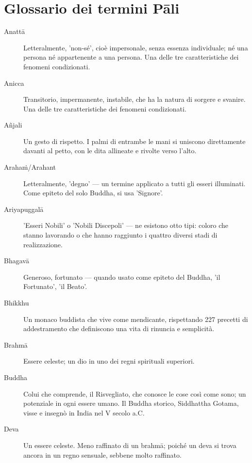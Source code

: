 \chapter{Glossario dei termini Pāli}

\enlargethispage{2\baselineskip}

\begin{description}

\item[Anattā] Letteralmente, 'non-sé', cioè impersonale, senza essenza
  individuale; né una persona né appartenente a una persona. Una delle tre
  caratteristiche dei fenomeni condizionati.

\item[Anicca] Transitorio, impermanente, instabile, che ha la natura di
  sorgere e svanire. Una delle tre caratteristiche dei fenomeni
  condizionati.

\item[Añjali] Un gesto di rispetto. I palmi di entrambe le mani si uniscono
  direttamente davanti al petto, con le dita allineate e rivolte
  verso l'alto.

\item[Arahaṁ/Arahant] Letteralmente, 'degno' --- un termine applicato a tutti
  gli esseri illuminati. Come epiteto del solo Buddha, si usa 'Signore'.

\item[Ariyapuggalā] 'Esseri Nobili' o 'Nobili Discepoli' --- ne esistono
  otto tipi: coloro che stanno lavorando o che hanno raggiunto i quattro
  diversi stadi di realizzazione.

\item[Bhagavā] Generoso, fortunato --- quando usato come epiteto del
  Buddha, 'il Fortunato', 'il Beato'.

\item[Bhikkhu] Un monaco buddista che vive come mendicante, rispettando
  227 precetti di addestramento che definiscono una vita di rinuncia e
  semplicità.

\item[Brahmā] Essere celeste; un dio in uno dei regni spirituali
  superiori.

\item[Buddha] Colui che comprende, il Risvegliato, che conosce le cose
  così come sono; un potenziale in ogni essere umano. Il Buddha storico,
  Siddhattha Gotama, visse e insegnò in India nel V secolo a.C.

\item[Deva] Un essere celeste. Meno raffinato di un brahmā; poiché un deva si
  trova ancora in un regno sensuale, sebbene molto raffinato.


\end{description}
